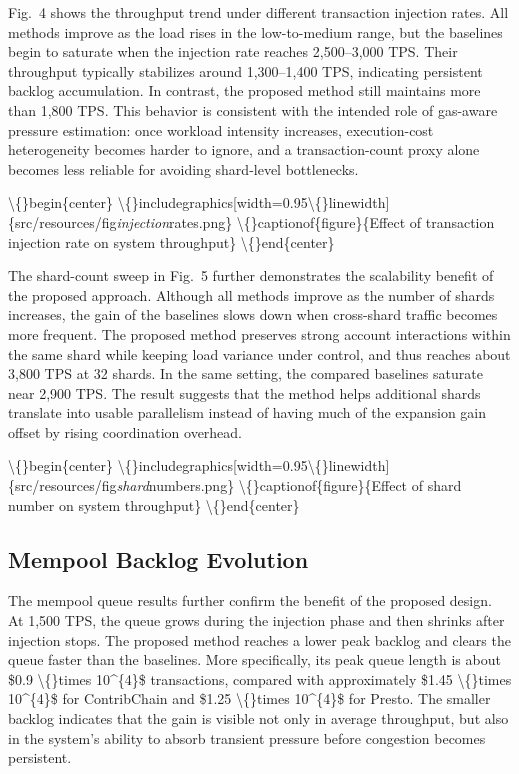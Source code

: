 \documentclass{article}
\begin{document}
Fig.~4 shows the throughput trend under different transaction injection rates. All methods improve as the load rises in the low-to-medium range, but the baselines begin to saturate when the injection rate reaches 2,500--3,000 TPS. Their throughput typically stabilizes around 1,300--1,400 TPS, indicating persistent backlog accumulation. In contrast, the proposed method still maintains more than 1,800 TPS. This behavior is consistent with the intended role of gas-aware pressure estimation: once workload intensity increases, execution-cost heterogeneity becomes harder to ignore, and a transaction-count proxy alone becomes less reliable for avoiding shard-level bottlenecks.

\textbackslash\{\}begin\{center\}
    \textbackslash\{\}includegraphics[width=0.95\textbackslash\{\}linewidth]\{src/resources/fig\emph{injection}rates.png\}
    \textbackslash\{\}captionof\{figure\}\{Effect of transaction injection rate on system throughput\}
\textbackslash\{\}end\{center\}

The shard-count sweep in Fig.~5 further demonstrates the scalability benefit of the proposed approach. Although all methods improve as the number of shards increases, the gain of the baselines slows down when cross-shard traffic becomes more frequent. The proposed method preserves strong account interactions within the same shard while keeping load variance under control, and thus reaches about 3,800 TPS at 32 shards. In the same setting, the compared baselines saturate near 2,900 TPS. The result suggests that the method helps additional shards translate into usable parallelism instead of having much of the expansion gain offset by rising coordination overhead.

\textbackslash\{\}begin\{center\}
    \textbackslash\{\}includegraphics[width=0.95\textbackslash\{\}linewidth]\{src/resources/fig\emph{shard}numbers.png\}
    \textbackslash\{\}captionof\{figure\}\{Effect of shard number on system throughput\}
\textbackslash\{\}end\{center\}

\subsection{Mempool Backlog Evolution}\label{sec:mempool-backlog-evolution}

The mempool queue results further confirm the benefit of the proposed design. At 1,500 TPS, the queue grows during the injection phase and then shrinks after injection stops. The proposed method reaches a lower peak backlog and clears the queue faster than the baselines. More specifically, its peak queue length is about \$0.9 \textbackslash\{\}times 10^\{4\}\$ transactions, compared with approximately \$1.45 \textbackslash\{\}times 10^\{4\}\$ for ContribChain and \$1.25 \textbackslash\{\}times 10^\{4\}\$ for Presto. The smaller backlog indicates that the gain is visible not only in average throughput, but also in the system's ability to absorb transient pressure before congestion becomes persistent.
\end{document}
